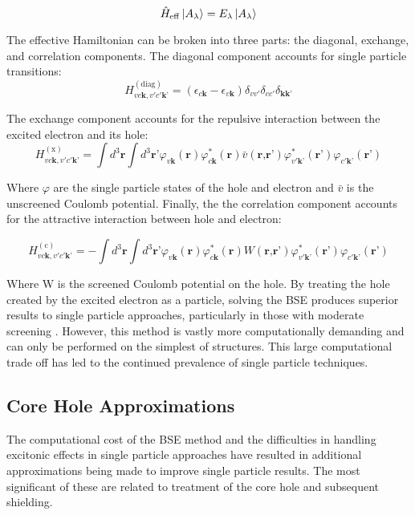 \begin{equation}
\hat{H}_{\mathrm{eff}} \ket{A_\lambda} = E_\lambda \ket{A_\lambda}
\end{equation}


The effective Hamiltonian can be broken into three parts: the diagonal, exchange, and correlation components\cite{draxl_bse_2009}. 
The diagonal component accounts for single particle transitions:
\begin{equation}
	H_{v c \textbf{k}, v' c'\textbf{k'}}^{(\mathrm{diag})} = (\epsilon_{c\textbf{k}}-\epsilon_{v \textbf{k}})\delta_{vv'}\delta_{cc'}\delta_{\textbf{kk'}}
\end{equation}

The exchange component accounts for the repulsive interaction between the excited electron and its hole: 
\begin{equation}
	H_{v c \textbf{k}, v' c'\textbf{k'}}^{(\mathrm{x})} = \int d^3\textbf{r}\int d^3\textbf{r'}\varphi_{v\textbf{k}}(\textbf{r})\varphi_{c\textbf{k}}^*(\textbf{r})\bar{v}(\textbf{r,r'})\varphi_{v'\textbf{k'}}^*(\textbf{r'})\varphi_{c'\textbf{k'}}(\textbf{r'})
\end{equation}

Where $\varphi$ are the single particle states of the hole and electron and $\bar{v}$ is the unscreened Coulomb potential.  Finally, the the correlation component accounts for the attractive interaction between hole and electron:

\begin{equation}
	H_{v c \textbf{k}, v' c'\textbf{k'}}^{(\mathrm{c})} = -\int d^3\textbf{r}\int d^3\textbf{r'}\varphi_{v\textbf{k}}(\textbf{r})\varphi_{c\textbf{k}}^*(\textbf{r})W(\textbf{r,r'})\varphi_{v'\textbf{k'}}^*(\textbf{r'})\varphi_{c'\textbf{k'}}(\textbf{r'})
\end{equation}

Where W is the screened Coulomb potential on the hole. By treating the hole created by the excited electron as a particle, solving the BSE produces superior results to single particle approaches, particularly in those with moderate screening \cite{draxl_bse_2009}.  However, this method is vastly more computationally demanding and can only be performed on the simplest of structures.   This large computational trade off has led to the continued prevalence of single particle techniques.


\subsection{Core Hole Approximations} \label{Core Hole Approximation}
The computational cost of the BSE method and the difficulties in handling excitonic effects in  single particle approaches have resulted in additional approximations being made to improve single particle results.  The most significant of these are related to treatment of the core hole and subsequent shielding. \\


